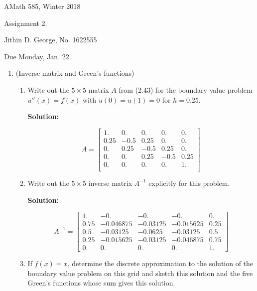 \documentclass[letterpaper,12pt]{article}
\begin{document}




\noindent
{\scriptsize AMath 585, Winter 2018} \hfill 

\begin{center}
\large
Assignment 2. 
\normalsize

Jithin D. George, No. 1622555

\end{center}
\noindent
Due Monday, Jan. 22.
\vspace{.3in}




\begin{enumerate}
\item (Inverse matrix and Green's functions)
\begin{enumerate}
\item Write out the $5\times 5$
matrix $A$ from (2.43) for the boundary value problem
$u''(x)=f(x)$ with $u(0)=u(1)=0$ for  $h = 0.25$.


{\bf Solution:}


\[A = \begin{bmatrix}
        1. & 0. & 0. & 0. & 0.\\
        0.25 & -0.5 & 0.25 & 0. & 0.\\ 
        0. & 0.25 & -0.5 & 0.25 & 0.\\ 
        0. & 0. & 0.25 & -0.5 & 0.25\\ 
        0. & 0. & 0. & 0. & 1.\\
        \end{bmatrix} \]


\item Write out the $5\times 5$
inverse matrix $A^{-1}$ explicitly for this problem.

{\bf Solution:}


 \[A^{-1} =\begin{bmatrix} 1. & -0. & -0. & -0. & 0.\\ 0.75 & -0.046875 & -0.03125 & -0.015625 & 0.25\\  0.5 & -0.03125 & -0.0625 & -0.03125 & 0.5\\  0.25 & -0.015625 & -0.03125 & -0.046875 & 0.75\\  0. & 0. & 0. & 0. & 1. \end{bmatrix}\]

\item
If $f(x)=x$, determine the discrete approximation to the solution of the
boundary value problem on this grid and sketch this solution and the five
Green's functions whose sum gives this solution.


\end{enumerate}
\end{enumerate}
\end{document}

